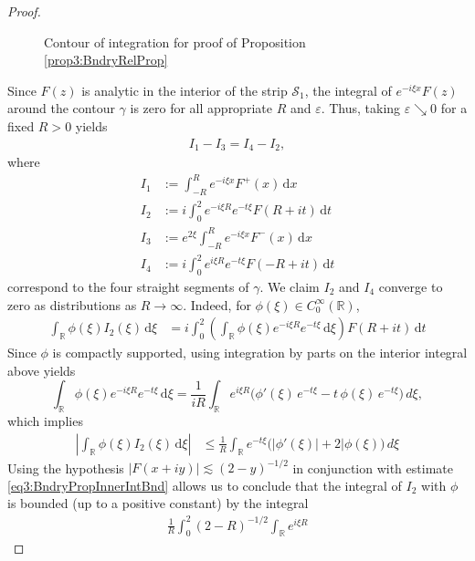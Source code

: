 \documentclass[../dissertation.tex]{subfiles}
\begin{document}
\begin{proof}
\begin{figure}[H]
\begin{tikzpicture}
		\end{tikzpicture}
		\caption{Contour of integration for proof of Proposition \ref{prop3:BndryRelProp}}
		\label{fig3:BndryRelCont}
	\end{figure}
	Since $F(z)$ is analytic in the interior 
	of the strip $\mathcal S_1$, the integral of $e^{-i\xi x} F(z)$ around the contour 
	$\gamma$ is zero for all appropriate $R$ and $\varepsilon$. Thus, taking 
	$\varepsilon\searrow 0$ for a fixed $R>0$ yields
	\begin{align}\label{eq3:BndryPropIs}
		I_1 - I_3 = I_4 - I_2,
	\end{align}
	where 
	\begin{align*}
		I_1 &:= \int_{-R}^R e^{-i \xi x} F^+(x) \, \mathrm{d}x \\
		I_2 &:= i \int_0^2 e^{-i\xi R} e^{-t\xi} F(R+it) \, \mathrm{d}t \\
		I_3 &:= e^{2\xi} \int_{-R}^R e^{-i\xi x} F^-(x) \, \mathrm{d}x \\
		I_4 &:= i \int_0^2 e^{i\xi R} e^{-t\xi} F(-R+it) \, \mathrm{d}t
	\end{align*}
	correspond to the four straight segments of $\gamma$. We claim $I_2$ and $I_4$
	converge to zero as distributions as $R \to \infty$. 
	Indeed, for $\phi(\xi) \in C_0^\infty(\mathbb R)$,
	\begin{align*}
		\int_{\mathbb R} \phi(\xi) I_2(\xi) \, \mathrm{d}\xi
			&= i \int_0^2 \left(\int_{\mathbb R} \phi(\xi) e^{-i\xi R} e^{-t\xi} \, \mathrm{d}\xi\right) F(R+it) \, \mathrm{d}t
	\end{align*}
	Since $\phi$ is compactly supported, using integration by parts on the interior integral above yields
	\[
		\int_{\mathbb R} \phi(\xi) e^{-i\xi R} e^{-t\xi} \, \mathrm{d}\xi
			= \frac{1}{iR} 
				\int_{\mathbb R} 
					e^{i\xi R} 
					\big(
						\phi'(\xi) \, e^{-t\xi} - t \,\phi(\xi)\, e^{-t\xi}
					\big)
				\,d\xi,
	\]
	which implies 
	\begin{align}\label{eq3:BndryPropInnerIntBnd}
		\left| \int_{\mathbb R} \phi(\xi) I_2(\xi) \, \mathrm{d}\xi \right|
			&\leq \frac{1}{R}
				\int_{\mathbb R} 
					e^{-t\xi}
					\big(
						|\phi'(\xi)| + 2|\phi(\xi)
					\big)
				\,d\xi	
	\end{align}
	Using the hypothesis $|F(x+iy)| \lesssim (2-y)^{-1/2}$ in conjunction with estimate
	\eqref{eq3:BndryPropInnerIntBnd} allows us to conclude that the integral of $I_2$ with 
	$\phi$ is bounded (up to a positive constant) by the integral
	\begin{align}
		\frac{1}{R} \int_0^2 (2-R)^{-1/2} \int_{\mathbb R} e^{i\xi R} 

\end{align}
\end{proof}
\end{document}
